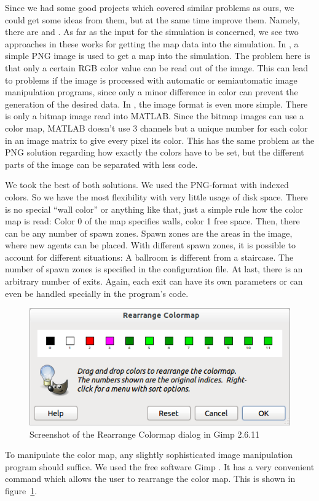 \documentclass[11pt]{article}
\begin{document}
\label{sub:input}

Since we had some good projects which covered similar
problems as ours, we could get some ideas from them, but at the same time
improve them.  Namely, there are \cite{multilevel} and \cite{airplane}.  As far
as the input for the simulation is concerned, we see two approaches in these
works for getting the map data into the simulation.  In \cite{multilevel}, a
simple PNG image is used to get a map into the simulation. The problem here is
that only a certain RGB color value can be read out of the image.  This can
lead to problems if the image is processed with automatic or semiautomatic
image manipulation programs, since only a minor difference in color can prevent
the generation of the desired data.  In \cite{airplane}, the image format is
even more simple.  There is only a bitmap image read into MATLAB.  Since the
bitmap images can use a color map, MATLAB doesn't use 3 channels but a unique
number for each color in an image matrix to give every pixel its color.  This
has the same problem as the PNG solution regarding how exactly the colors have
to be set, but the different parts of the image can be separated with less
code.

We took the best of both solutions. We used the PNG-format with indexed colors.
So we have the most flexibility with very little usage of disk space.  There is
no special ``wall color'' or anything like that, just a simple rule how the
color map is read: Color 0 of the map specifies walls, color 1 free space.
Then, there can be any number of spawn zones.  Spawn zones are the areas in the
image, where new agents can be placed. With different spawn zones, it is
possible to account for different situations: A ballroom is different from a
staircase.  The number of spawn zones is specified in the configuration file.
At last, there is an arbitrary number of exits.  Again, each exit can have its
own parameters or can even be handled specially in the program's code. 

\begin{figure}[h]
	\centering
	\includegraphics[scale=0.5]{images/gimp.png}
	\caption{Screenshot of the Rearrange Colormap dialog in Gimp 2.6.11}
	\label{gimpscreenshot}
	
\end{figure}
To manipulate the color map, any slightly sophisticated image manipulation
program should suffice. We used the free software Gimp \cite{gimp}. It has a
very convenient command which allows the user to rearrange the color map. This
is shown in figure~\ref{gimpscreenshot}.
\end{document}
